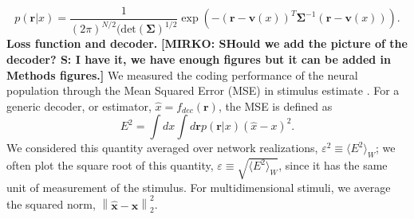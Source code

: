 \documentclass[a4paper]{article}%
\begin{document}
\begin{equation}
p\left(  \mathbf{r}|x\right)  = \frac{1}{\left(  2\pi\right)  ^{N/2}
(\text{det}\left(  \bm{\Sigma}\right)  ^{1/2}} \exp\left(  -\left(  \mathbf{r} -
\mathbf{v}(x)\right)  ^{T}\bm{\Sigma}^{-1}\left(  \mathbf{r} - \mathbf{v}
(x)\right)  \right)  . \label{Eq:LIn}
\end{equation}
\newline\newline\textbf{Loss function and decoder.} 
\textbf{[MIRKO: SHould we add the picture of the decoder? S: I have it, we have enough figures but it can be added in Methods figures.]}
We measured the coding performance of the neural population through  the Mean
Squared Error (MSE) in stimulus estimate \cite{Dayan2001TheoreticalSystems}. For a generic
decoder, or estimator, $\hat{x} = f_{dec}(\mathbf{r})$, the MSE is defined as
\begin{equation}
E^{2} = \int dx \int d\mathbf{r} p(\mathbf{r}|x) \left(  \hat{x} -x\right)
^{2}. \label{Eq:MSE}%
\end{equation}
We considered this quantity averaged over network realizations, $\varepsilon
^{2} \equiv\langle E^{2}\rangle_{W}$; we often plot the square root of this
quantity, $\varepsilon\equiv\sqrt{\langle E^{2}\rangle_{W}}$, since it has the
same unit of measurement of the stimulus. For multidimensional stimuli, we average the squared norm, $\left\|
\hat{\mathbf{x}} - \mathbf{x}\right\|  _{2}^{2}$.
\end{document}
